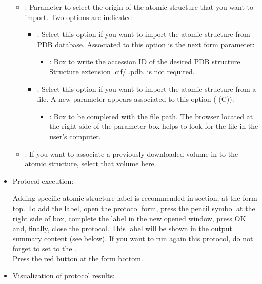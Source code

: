 \begin{itemize}
  \begin{itemize}
   \item {}: Parameter to select the origin of the atomic structure that you want to import. Two options are indicated:
    \begin{itemize}
	 \item {}: Select this option if you want to import the atomic structure from PDB database. Associated to this option is the next form parameter:
	  \begin{itemize}
	   \item {}: Box to write the accession ID of the desired PDB structure. Structure extension .cif/ .pdb. is not required.
	  \end{itemize}
	 \item {}: Select this option if you want to import the atomic structure from a file. A new parameter appears associated to this option ( (C)):
	  \begin{itemize}
	   \item {}: Box to be completed with the file path. The browser located at the right side of the parameter box helps to look for the file in the user's computer. 
	  \end{itemize}
	\end{itemize}
   \item {}: If you want to associate a previously downloaded volume in \scipion to the atomic structure, select that volume here.
   \end{itemize}

  \item Protocol execution:
  
  Adding specific atomic structure label is recommended in  section, at the form top. To add the label, open the protocol form, press the pencil symbol at the right side of  box, complete the label in the new opened window, press OK and, finally, close the protocol. This label will be shown in the output summary content (see below). If you want to run again this protocol, do not forget to set to  the .\\
  Press the  red button at the form bottom.
  
  \item Visualization of protocol results:
  

\end{itemize}
